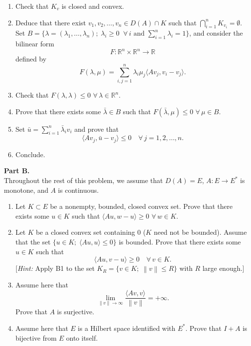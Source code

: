 \documentclass[12pt]{article}
\newcommand{\norm}[1]{\left\|#1\right\|}
\newcommand{\ip}[2]{\langle #1, #2 \rangle}
\newcommand{\R}{\mathbb{R}}
\begin{document}
\begin{enumerate}
\item Check that $K_v$ is closed and convex.
 
\item Deduce that there exist $v_1, v_2, \ldots, v_n \in D(A) \cap K$ such that
$\bigcap_{i=1}^n K_{v_i} = \emptyset$.
Set $B = \{\lambda = (\lambda_1, \ldots, \lambda_n);\; \lambda_i \ge 0\;\;\forall\, i \text{ and } \sum_{i=1}^n \lambda_i = 1\}$,
and consider the bilinear form
\[
F : \R^n \times \R^n \to \R
\]
defined by
\[
F(\lambda, \mu) = \sum_{i,j=1}^n \lambda_i \mu_j \ip{Av_j}{v_i - v_j}.
\]
 
\item Check that $F(\lambda, \lambda) \le 0$ $\forall\, \lambda \in \R^n$.
 
\item Prove that there exists some $\bar\lambda \in B$ such that $F(\bar\lambda, \mu) \le 0$ $\forall\, \mu \in B$.
 
 
\item Set $\bar{u} = \sum_{i=1}^n \bar\lambda_i v_i$ and prove that
\[
\ip{Av_j}{\bar{u} - v_j} \le 0 \quad \forall\, j = 1, 2, \ldots, n.
\]
 
\item Conclude.
\end{enumerate}
 
\noindent\textbf{Part B.}\\
Throughout the rest of this problem, we assume that $D(A) = E$,
$A : E \to E^*$ is monotone, and $A$ is continuous.
 
\begin{enumerate}
\item Let $K \subset E$ be a nonempty, bounded, closed convex set. Prove that there exists
some $u \in K$ such that $\ip{Au}{w - u} \ge 0$ $\forall\, w \in K$.
 
\noindent[\textit{Hint:} Consider $v_t = (1-t)u + tw$ with $t \in (0,1)$ and $w \in K$.]
 
\item Let $K$ be a closed convex set containing $0$ ($K$ need not be bounded). Assume
that the set $\{u \in K;\; \ip{Au}{u} \le 0\}$ is bounded. Prove that there exists some
$u \in K$ such that
\[
\ip{Au}{v - u} \ge 0 \quad \forall\, v \in K.
\]
[\textit{Hint:} Apply B1 to the set $K_R = \{v \in K;\; \norm{v} \le R\}$ with $R$ large enough.]
 
\item Assume here that
\[
\lim_{\norm{v}\to\infty} \frac{\ip{Av}{v}}{\norm{v}} = +\infty.
\]
Prove that $A$ is surjective.
 
\item Assume here that $E$ is a Hilbert space identified with $E^*$. Prove that $I + A$
is bijective from $E$ onto itself.
\end{enumerate}
 
\end{document}
